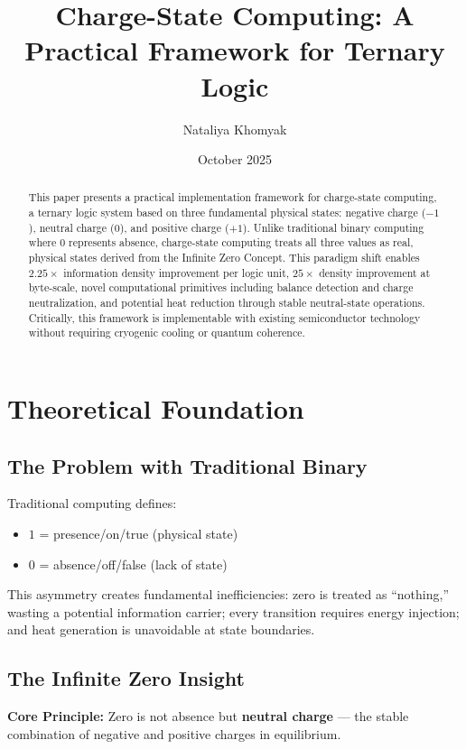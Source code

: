 \documentclass[11pt,a4paper]{article}
\title{Charge-State Computing: A Practical Framework for Ternary Logic}
\author{Nataliya Khomyak}
\date{October 2025}
\begin{document}
\maketitle

\begin{abstract}
This paper presents a practical implementation framework for charge-state computing, a ternary logic system based on three fundamental physical states: negative charge ($-1$), neutral charge ($0$), and positive charge ($+1$). Unlike traditional binary computing where $0$ represents absence, charge-state computing treats all three values as real, physical states derived from the Infinite Zero Concept. This paradigm shift enables $2.25\times$ information density improvement per logic unit, $25\times$ density improvement at byte-scale, novel computational primitives including balance detection and charge neutralization, and potential heat reduction through stable neutral-state operations. Critically, this framework is implementable with existing semiconductor technology without requiring cryogenic cooling or quantum coherence.
\end{abstract}

\section{Theoretical Foundation}

\subsection{The Problem with Traditional Binary}

Traditional computing defines:
\begin{itemize}
\item $1$ = presence/on/true (physical state)
\item $0$ = absence/off/false (lack of state)
\end{itemize}

This asymmetry creates fundamental inefficiencies: zero is treated as ``nothing,'' wasting a potential information carrier; every transition requires energy injection; and heat generation is unavoidable at state boundaries.

\subsection{The Infinite Zero Insight}

\textbf{Core Principle:} Zero is not absence but \textbf{neutral charge} --- the stable combination of negative and positive charges in equilibrium.
\end{document}
